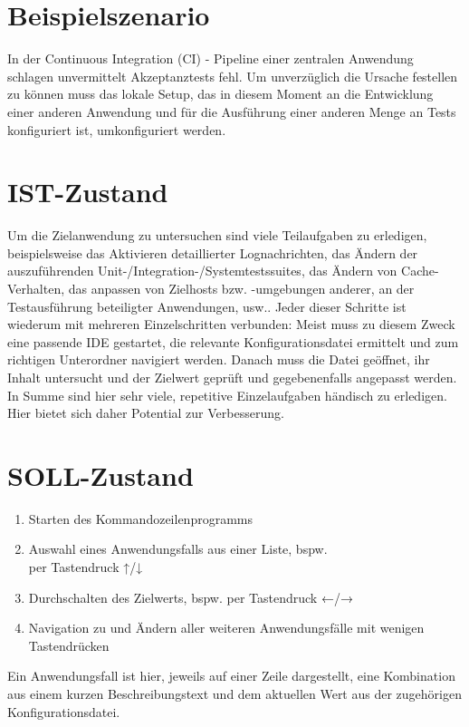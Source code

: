 \documentclass[a4paper,11pt]{article}
\begin{document}
\section{Beispielszenario}
In der Continuous Integration (CI) - Pipeline einer zentralen Anwendung schlagen
unvermittelt Akzeptanztests fehl. Um unverzüglich die Ursache festellen zu können
muss das lokale Setup, das in diesem Moment an die Entwicklung einer anderen
Anwendung und für die Ausführung einer anderen Menge an Tests konfiguriert ist,
umkonfiguriert werden.

\section{IST-Zustand}
Um die Zielanwendung zu untersuchen sind viele Teilaufgaben zu erledigen,
beispielsweise das Aktivieren detaillierter Lognachrichten, das Ändern der
auszuführenden Unit-/Integration-/Systemtestssuites, das Ändern von Cache-Verhalten,
das anpassen von Zielhosts bzw. -umgebungen anderer, an der Testausführung
beteiligter Anwendungen, usw.. Jeder dieser Schritte ist wiederum mit mehreren
Einzelschritten verbunden: Meist muss zu diesem Zweck eine passende IDE gestartet,
die relevante Konfigurationsdatei ermittelt und zum richtigen Unterordner navigiert
werden. Danach muss die Datei geöffnet, ihr Inhalt untersucht und der Zielwert
geprüft und gegebenenfalls angepasst werden. In Summe sind hier sehr viele,
repetitive Einzelaufgaben händisch zu erledigen. Hier bietet sich daher Potential
zur Verbesserung.

\section{SOLL-Zustand}
\begin{enumerate}
	\item Starten des Kommandozeilenprogramms
	\item Auswahl eines Anwendungsfalls aus einer Liste, bspw.\\
	      per Tastendruck ↑/↓
	\item Durchschalten des Zielwerts, bspw. per Tastendruck ←/→
	\item Navigation zu und Ändern aller weiteren Anwendungsfälle mit wenigen
	      Tastendrücken
\end{enumerate}
Ein Anwendungsfall ist hier, jeweils auf einer Zeile dargestellt, eine Kombination
aus einem kurzen Beschreibungstext und dem aktuellen Wert aus der zugehörigen
Konfigurationsdatei.
\end{document}
